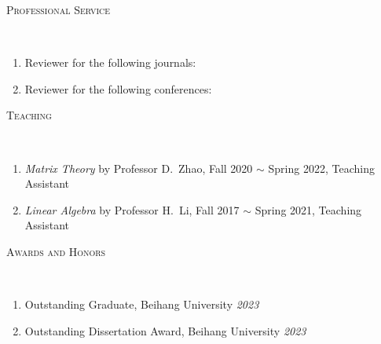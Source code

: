 \documentclass[a4paper, 10pt]{article}
\newenvironment{changemargin}[2]{%
  \begin{list}{}{%
    \setlength{\topsep}{0pt}%
    \setlength{\leftmargin}{#1}%
    \setlength{\rightmargin}{#2}%
    \setlength{\listparindent}{\parindent}%
    \setlength{\itemindent}{\parindent}%
    \setlength{\parsep}{\parskip}%
  }%
  \item[]}{\end{list}
}
\newcommand{\lineover}{
	\begin{changemargin}{-0.05in}{-0.05in}
		\vspace*{-8pt}
		\hrulefill \\
		\vspace*{-2pt}
	\end{changemargin}
}
\newcommand{\header}[1]{
	\begin{changemargin}{-0.5in}{-0.5in}
		\scshape{#1}\\
  	\lineover
	\end{changemargin}
}
\newenvironment{body} {
	\vspace*{-16pt}
	\begin{changemargin}{-0.3in}{-0.5in}
  }	
	{\end{changemargin}
}
\begin{document}
\bigskip
\header{\LARGE{Professional Service}}
\begin{body}
	\vspace{18pt}
	\begin{enumerate}
	\item Reviewer for the following journals: \emph{}
	\item Reviewer for the following conferences: \emph{}
	\end{enumerate}
\end{body}

%
\bigskip
\header{\LARGE{Teaching}}
\begin{body}
	\vspace{18pt}
	\begin{enumerate}
	\item \emph{Matrix Theory} by Professor D.~Zhao, Fall 2020 $\sim$ Spring 2022, Teaching Assistant
	\item \emph{Linear Algebra} by Professor H.~Li, Fall 2017 $\sim$ Spring 2021, Teaching Assistant
	\end{enumerate}
\end{body}


\bigskip
\header{\LARGE{Awards and Honors}}
\begin{body}
    \vspace{18pt}
    \begin{enumerate}
	\item {Outstanding Graduate}, Beihang University \hfill{} \emph{2023}
	\item {Outstanding Dissertation Award}, Beihang University \hfill{} \emph{2023}
    \end{enumerate}
\end{body}
\end{document}
